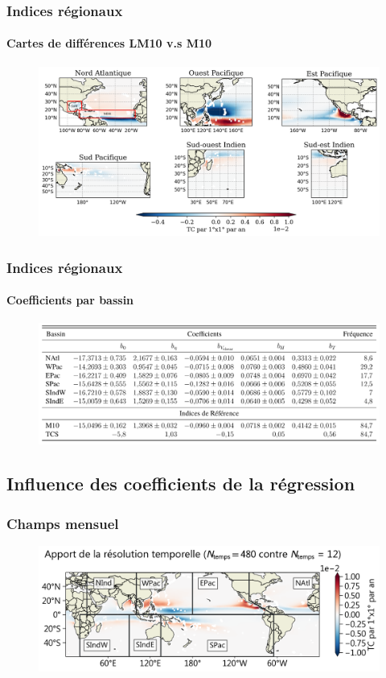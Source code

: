 \documentclass[aspectratio=169, usepdftitle=false, xcolor={dvipsnames}, 9pt,table]{beamer}
\begin{document}
\begin{frame}[c]
    \frametitle{Indices régionaux}
    \framesubtitle{Cartes de différences LM10 v.s M10}
    \begin{figure}
        \centering
        \includegraphics[width=\textwidth]{Figures/Annexes/diff_LM10_M10.png}
    \end{figure} 
\end{frame}

\begin{frame}[c]
    \frametitle{Indices régionaux}
    \framesubtitle{Coefficients par bassin}
    \begin{figure}
        \centering
        \includegraphics[width=\textwidth]{Figures/Annexes/coefs_indices_locaux.png}
    \end{figure} 
\end{frame}

\subsection*{Influence des coefficients de la régression}
\begin{frame}[c]
    \frametitle{Champs mensuel}
    \begin{figure}
        \centering
        \includegraphics[width=\textwidth]{Figures/Annexes/apport_mensuel.png}
    \end{figure}
\end{frame}
\end{document}
